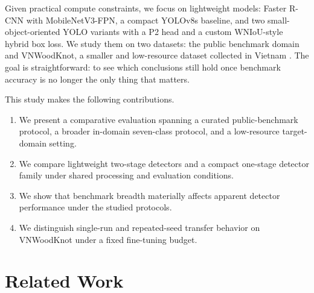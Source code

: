 \documentclass[cmc,article,submit,moreauthors,pdftex]{Definitions/tsp}
\begin{document}
Given practical compute constraints, we focus on lightweight models: Faster R-CNN with MobileNetV3-FPN, a compact YOLOv8s baseline, and two small-object-oriented YOLO variants with a P2 head and a custom WNIoU-style hybrid box loss. We study them on two datasets: the public benchmark domain \citep{kodytek_dataset} and VNWoodKnot, a smaller and low-resource dataset collected in Vietnam \citep{TRAN2025112039}. The goal is straightforward: to see which conclusions still hold once benchmark accuracy is no longer the only thing that matters.

This study makes the following contributions.

\begin{enumerate}
  \item We present a comparative evaluation spanning a curated public-benchmark protocol, a broader in-domain seven-class protocol, and a low-resource target-domain setting.
  \item We compare lightweight two-stage detectors and a compact one-stage detector family under shared processing and evaluation conditions.
  \item We show that benchmark breadth materially affects apparent detector performance under the studied protocols.
    \item We distinguish single-run and repeated-seed transfer behavior on VNWoodKnot under a fixed fine-tuning budget.
\end{enumerate}


\section{Related Work}
\label{sec:related-work}

\end{document}
